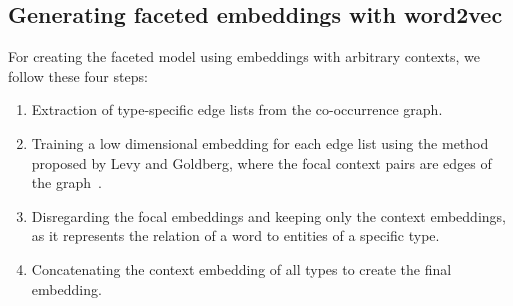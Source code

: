 \subsection{Generating faceted embeddings with word2vec}
For creating the faceted model using embeddings with arbitrary contexts, we follow these four steps: 
\begin{enumerate}        
 \item Extraction of type-specific edge lists from the co-occurrence graph. 
 \item Training a low dimensional embedding for each edge list using the method proposed by  Levy and Goldberg, where the focal context pairs are edges of the graph~.
 \item Disregarding the focal embeddings and keeping only the context embeddings, as it represents the relation of a word to entities of a specific type. 
 \item Concatenating the context embedding of all types to create the final embedding. 
 \end{enumerate}
